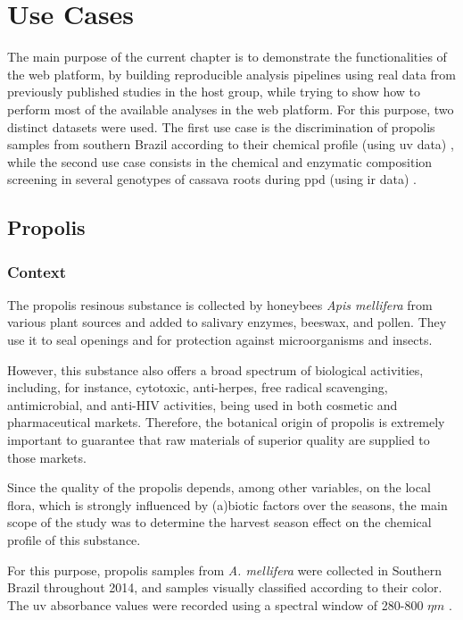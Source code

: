 
\chapter{Use Cases} \label{use_cases}

The main purpose of the current chapter is to demonstrate the functionalities of the web platform, by building reproducible analysis pipelines using real data from previously published studies in the host group, while trying to show how to perform most of the available analyses in the web platform. For this purpose, two distinct datasets were used. The first use case is the discrimination of propolis samples from southern Brazil according to their chemical profile (using \gls{uv} data) \citep{tomazzoli2015discrimination}, while the second use case consists in the chemical and enzymatic composition screening in several genotypes of cassava roots during \gls{ppd} (using \gls{ir} data) \citep{uarrota2014metabolomics}.


\section{Propolis}

\subsection{Context}

The propolis resinous substance is collected by honeybees \textit{Apis mellifera} from various plant sources and added to salivary enzymes, beeswax, and pollen. They use it to seal openings and for protection against microorganisms and insects.

However, this substance also offers a broad spectrum of biological activities, including, for instance, cytotoxic, anti-herpes, free radical scavenging, antimicrobial, and anti-HIV activities, being used in both cosmetic and pharmaceutical markets. Therefore, the botanical origin of propolis is extremely important to guarantee that raw materials of superior quality are supplied to those markets.

Since the quality of the propolis depends, among other variables, on the local flora,
which is strongly influenced by (a)biotic factors over the seasons, the main scope of the study was to determine the harvest season effect on the chemical profile of this substance.

For this purpose, propolis samples from \textit{A. mellifera} were collected in Southern Brazil throughout 2014, and samples visually classified according to their color. The \gls{uv} absorbance values were recorded using a spectral window of 280-800 $\eta m$ \citep{tomazzoli2015discrimination}.


